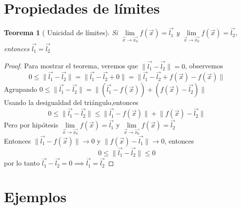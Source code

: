 \documentclass[letterpaper]{article}
\providecommand{\norm}[1]{\lVert#1\rVert}
\renewcommand{\*}{\cdot}
\newtheorem{theorem}{Teorema}[section]
\theoremstyle{definition}
\begin{document}
\section{Propiedades de límites}
\begin{theorem}[ Unicidad de límites]
	Si $ \lim\limits_{\vec{x} \to \vec{x_0}}f(\vec{x}) = \vec{l_1} $ y $ \lim\limits_{\vec{x} \to \vec{x_0}}f(\vec{x}) = \vec{l_2} $, entonces $ \vec{l_1} = \vec{l_2} $
\end{theorem}
\begin{proof}
	Para mostrar el teorema, veremos que $ \norm{\vec{l_1} - \vec{l_2}} = 0 $, observemos $$ 0 \leq \norm{\vec{l_1} - \vec{l_2}} = \norm{\vec{l_1} - \vec{l_2} + 0} = \norm{\vec{l_1} - \vec{l_2} + f(\vec{x}) - f (\vec{x})}  $$ Agrupando $ 0 \leq \norm{\vec{l_1} - \vec{l_2}} = \norm{(\vec{l_1} - f(\vec{x})) + (f(\vec{x}) - \vec{l_2})} $\\
	
	\noindent Usando la desigualdad del triángulo,entonces
	\[ 0 \leq \norm{\vec{l_1} - \vec{l_2}  }  \leq \norm{ \vec{l_1} - f(\vec{x}) } + \norm{f(\vec{x}) - \vec{l_2}}  \] 
	Pero por hipótesis $ \lim\limits_{\vec{x} \to \vec{x_0}}f(\vec{x}) = \vec{l_1} $ y $ \lim\limits_{\vec{x} \to \vec{x_0}}f(\vec{x}) = \vec{l_2} $\\

	\noindent Entonces $ \norm{ \vec{l_1} - f(\vec{x}) } \to 0 $ y $ \norm{f(\vec{x}) - \vec{l_1}} \to 0  $, entonces
	\[ 0 \leq \norm{\vec{l_1} - \vec{l_2}} \leq 0  \] por lo tanto $ \vec{l_1} - \vec{l_2}  = 0 \implies \vec{l_1} = \vec{l_2} $
\end{proof}
\section*{Ejemplos}
\end{document}
